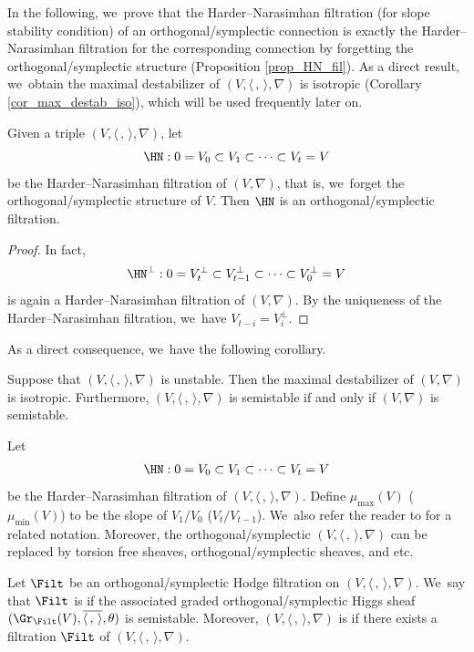 In the following, we~prove that the Harder--Narasimhan filtration (for slope stability condition) of an orthogonal/symplectic connection is exactly the Harder--Narasimhan filtration for the corresponding connection by forgetting the orthogonal/symplectic structure (Proposition \ref{prop_HN_fil}). As a direct result, we~obtain the maximal destabilizer of $(V, \langle \,,\, \rangle, \nabla)$ is isotropic (Corollary \ref{cor_max_destab_iso}), which will be used frequently later on.

\begin{prop}\label{prop_HN_fil}
Given a triple $(V,\langle \,, \, \rangle,\nabla)$, let
\[
\HN:0=V_0\subset V_1 \subset \cdots \subset V_t=V
\]
be the Harder--Narasimhan filtration of $(V, \nabla)$, that is, we~forget the orthogonal/symplectic structure of $V$. Then $\HN$ is an orthogonal/symplectic filtration.
\end{prop}

\begin{proof}
In fact,
\[
\HN^\perp:0=V_t^\perp\subset V_{t-1}^\perp \subset \cdots \subset V_0^\perp=V
\]
is again a Harder--Narasimhan filtration of $(V, \nabla)$. By the uniqueness of the Harder--Narasimhan filtration, we~have $V_{t-i}=V_{i}^\perp$.
\end{proof}

As a direct consequence, we~have the following corollary.
\begin{cor}\label{cor_max_destab_iso}
Suppose that $(V,\langle \,, \, \rangle,\nabla)$ is unstable. Then the maximal destabilizer of $(V, \nabla)$ is isotropic. Furthermore, $(V,\langle \,, \, \rangle,\nabla)$ is semistable if and only if $(V, \nabla)$ is semistable.
\end{cor}

\begin{notn}
Let
\begin{align*}
\HN:0=V_0\subset V_1 \subset \cdots \subset V_t=V
\end{align*}
be the Harder--Narasimhan filtration of $(V,\langle \,, \, \rangle,\nabla)$. Define $\mu_{\max}(V)$ (\resp $\mu_{\min}(V)$) to be the slope of $V_1 / V_0$ (\resp $V_t/V_{t-1}$). We~also refer the reader to \cite[Def.\,1.3.2]{HL97} for a related notation. Moreover, the orthogonal/symplectic \lconnection $(V,\langle \,, \, \rangle,\nabla)$ can be replaced by torsion free sheaves, orthogonal/symplectic sheaves, \lconnections and etc.
\end{notn}

\skpt
\begin{defn} \label{gr-semistable}
Let $\Filt$ be an orthogonal/symplectic Hodge filtration on $(V, \langle \,,\, \rangle,\nabla)$. We~say that $\Filt$ is \emph{\grsemistable} if the associated graded orthogonal/sym\-plec\-tic Higgs sheaf $(\Gr_{\Filt}(V), \overline{\langle \,, \, \rangle},\theta)$ is semistable. Moreover, $(V, \langle \,, \, \rangle, \nabla)$ is \emph{\grsemistable} if there exists a \grsemistable filtration $\Filt$ of $(V, \langle \,,\, \rangle,\nabla)$.
\end{defn}

